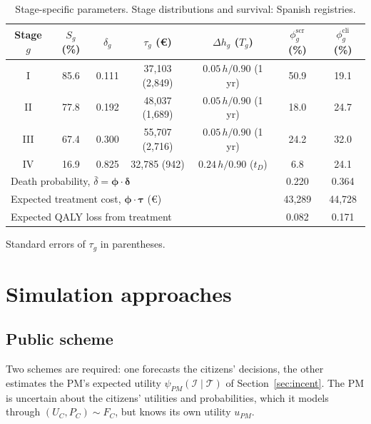 \documentclass[12pt]{article}
\begin{document}
\begin{table}[h!]
\centering
\footnotesize
\caption{Stage-specific parameters. Stage distributions and survival: Spanish registries.}
\label{tab:death_prob}
\begin{tabular}{c c c c c c c}
\toprule
\textbf{Stage $g$} & \textbf{$S_g$ (\%)} & \textbf{$\delta_g$} & \textbf{$\tau_g$ (€)} & \textbf{$\Delta h_g$ ($T_g$)} & \textbf{$\phi^{\text{scr}}_g$ (\%)} & \textbf{$\phi^{\text{cli}}_g$ (\%)} \\
\midrule
I   & 85.6 & 0.111 & 37{,}103 (2{,}849) & $0.05\,h/0.90$ (1 yr)  & 50.9 & 19.1 \\
II  & 77.8 & 0.192 & 48{,}037 (1{,}689) & $0.05\,h/0.90$ (1 yr)  & 18.0 & 24.7 \\
III & 67.4 & 0.300 & 55{,}707 (2{,}716) & $0.05\,h/0.90$ (1 yr)  & 24.2 & 32.0 \\
IV  & 16.9 & 0.825 & 32{,}785 (942)      & $0.24\,h/0.90$ ($t_D$) &  6.8 & 24.1 \\
\midrule
\multicolumn{5}{l}{Death probability, $\bar\delta = \boldsymbol{\phi} \cdot \boldsymbol{\delta}$} & 0.220 & 0.364 \\
\multicolumn{5}{l}{Expected treatment cost, $\boldsymbol{\phi} \cdot \boldsymbol{\tau}$ (€)} & 43{,}289 & 44{,}728 \\
\multicolumn{5}{l}{Expected QALY loss from treatment} & 0.082 & 0.171 \\
\bottomrule
\end{tabular}

\vspace{2pt}
\raggedright\scriptsize
Standard errors of $\tau_g$ in parentheses.
\end{table}

\section{Simulation approaches}\label{app:simulation}
\subsection{Public scheme}\label{app:simulation_public}
Two schemes are required: one forecasts the citizens' decisions, the other estimates the PM's expected utility $\psi_{PM}(\mathcal{I} \mid \mathcal{T})$ of Section~\ref{sec:incent}. The PM is uncertain about the citizens' utilities and probabilities, which it models through $(U_C, P_C) \sim F_C$, but knows its own utility $u_{PM}$.
\end{document}
